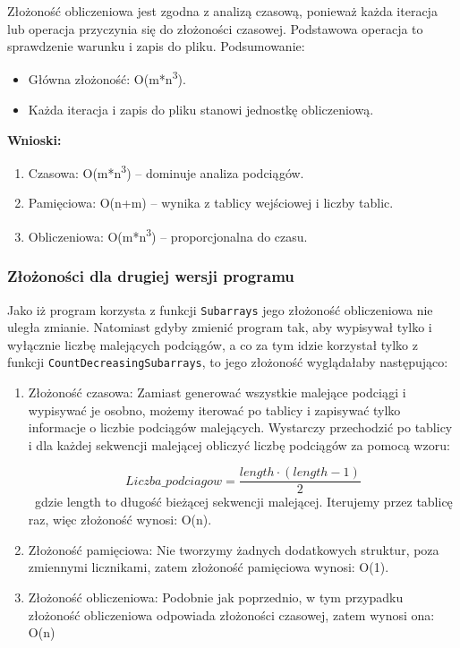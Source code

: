 \documentclass[a4paper,12pt]{article}
\begin{document}
\begin{enumerate}
Złożoność obliczeniowa jest zgodna z analizą czasową, ponieważ każda iteracja lub operacja przyczynia się do złożoności czasowej. Podstawowa operacja to sprawdzenie warunku i zapis do pliku. Podsumowanie: 
\begin{itemize}
\item{Główna złożoność: O(m*n\textsuperscript{3}).}
\item{Każda iteracja i zapis do pliku stanowi jednostkę obliczeniową.}
\end{itemize}
\end{enumerate}

\textbf{Wnioski:}
\begin{enumerate}
\item{Czasowa: O(m*n\textsuperscript{3}) – dominuje analiza podciągów.}
\item{Pamięciowa: O(n+m) – wynika z tablicy wejściowej i liczby tablic.}
\item{Obliczeniowa: O(m*n\textsuperscript{3}) – proporcjonalna do czasu.}
\end{enumerate}

\newpage

\subsubsection{Złożoności dla drugiej wersji programu}

Jako iż program korzysta z funkcji \texttt{Subarrays} jego złożoność obliczeniowa nie uległa zmianie. Natomiast gdyby zmienić program tak, aby wypisywał tylko i wyłącznie liczbę malejących podciągów, a co za tym idzie korzystał tylko z funkcji \texttt{CountDecreasingSubarrays}, to jego złożoność wyglądałaby następująco:

\begin{enumerate}
\item{Złożoność czasowa:}
Zamiast generować wszystkie malejące podciągi i wypisywać je osobno, możemy iterować po tablicy i zapisywać tylko informacje o liczbie podciągów malejących. Wystarczy przechodzić po tablicy i dla każdej sekwencji malejącej obliczyć liczbę podciągów za pomocą wzoru:

\texttt{$$Liczba\_podciagow= \frac{length\cdot(length-1)}{2}$$ }gdzie length to długość bieżącej sekwencji malejącej. Iterujemy przez tablicę raz, więc złożoność wynosi: O(n).
\item{Złożoność pamięciowa:}
Nie tworzymy żadnych dodatkowych struktur, poza zmiennymi licznikami, zatem złożoność pamięciowa wynosi: O(1).
\item{Złożoność obliczeniowa:}
Podobnie jak poprzednio, w tym przypadku złożoność obliczeniowa odpowiada złożoności czasowej, zatem wynosi ona: O(n)
\end{enumerate}
\end{document}
